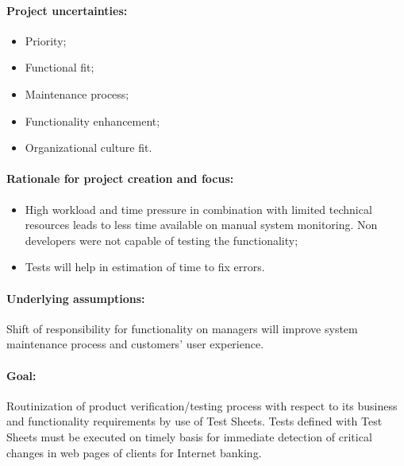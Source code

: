 \paragraph{Project uncertainties:}
\begin{itemize}
	\item Priority;
	\item Functional fit;
	\item Maintenance process;
	\item Functionality enhancement;
	\item Organizational culture fit.
\end{itemize}

\paragraph{Rationale for project creation and focus:} 
\begin{itemize}
	\item High workload and time pressure in combination with limited technical resources leads to less time available on manual system monitoring. Non developers were not capable of testing the functionality;
	\item Tests will help in estimation of time to fix errors.
\end{itemize}


\paragraph{Underlying assumptions:} Shift of responsibility for functionality  on managers will improve system maintenance process and customers' user experience. 

\paragraph{Goal:} Routinization of product verification/testing process with respect to its business and functionality requirements by use of Test Sheets. Tests defined with Test Sheets must be executed on timely basis for immediate detection of critical changes in web pages of clients for Internet banking.

